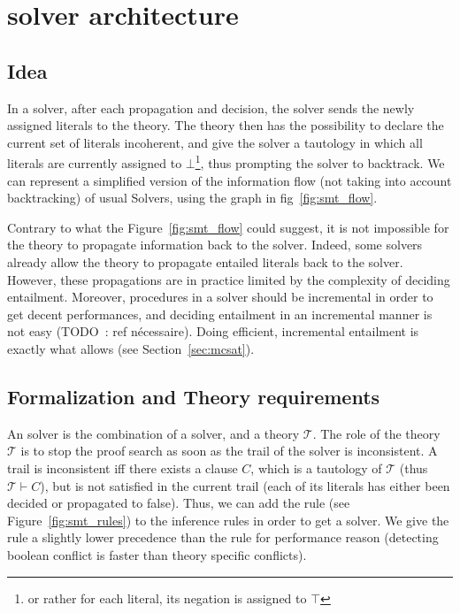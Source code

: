 \documentclass{article}
\begin{document}
\section{\smt{} solver architecture}\label{sec:smt}

\subsection{Idea}\label{sec:smt_flow}

In a \smt{} solver, after each propagation and decision, the solver sends the newly
assigned literals to the theory. The theory then has the possibility to declare the
current set of literals incoherent, and give the solver a tautology in which all
literals are currently assigned to $\bot$\footnote{or rather for each literal, its negation
is assigned to $\top$}, thus prompting the solver to backtrack.
We can represent a simplified version of the information flow (not taking into
account backtracking) of usual \smt{} Solvers, using the graph in fig~\ref{fig:smt_flow}.

Contrary to what the Figure~\ref{fig:smt_flow} could suggest, it is not impossible
for the theory to propagate information back to the \sat{} solver. Indeed,
some \smt{} solvers already allow the theory to propagate entailed literals back to the
\sat{} solver. However, these propagations are in practice limited by the complexity
of deciding entailment. Moreover, procedures in a \smt{} solver should be incremental
in order to get decent performances, and deciding entailment in an incremental manner
is not easy (TODO~: ref nécessaire). Doing efficient, incremental entailment is exactly
what \mcsat{} allows (see Section~\ref{sec:mcsat}).

\subsection{Formalization and Theory requirements}

An \smt{} solver is the combination of a \sat{} solver, and a theory $\mathcal{T}$.
The role of the theory $\mathcal{T}$ is to stop the proof search as soon as the trail
of the \sat{} solver is inconsistent. A trail is inconsistent iff there exists a clause
$C$, which is a tautology of $\mathcal{T}$ (thus $\mathcal{T} \vdash C$), but is not
satisfied in the current trail (each of its literals has either been decided or
propagated to false). Thus, we can add the  rule (see
Figure~\ref{fig:smt_rules}) to the \cdcl{} inference rules in order to get a \smt{} solver.
We give the  rule a slightly lower precedence than the
 rule for performance reason (detecting boolean conflict is
faster than theory specific conflicts).
\end{document}
